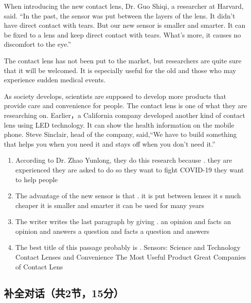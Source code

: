 \documentclass{ExamJHSEngl}
\begin{document}
When introducing the new contact lens, Dr. Guo Shiqi, a researcher at Harvard, said. “In the past, the sensor was put between the layers  of the lens. It didn't have direct contact  with tears. But our new sensor is smaller and smarter. It can be fixed to a lens and keep direct contact with tears. What's more, it causes no discomfort to the eye.”

The contact lens has not been put to the market, but researchers are quite sure that it will be welcomed. It is especially useful for the old and those who may experience sudden medical events.

As society develops, scientists are supposed to develop more products that provide care and convenience  for people. The contact lens is one of what they are researching on. Earlier，a California company developed another kind of contact lens using LED technology. It can show the health information on the mobile phone. Steve Sinclair, head of the company, said,“We have to build something that helps you when you need it and stays off when you don't need it.”

\begin{enumerate}[resume,ref={\arabic*},labelsep=-0.1em]

  \item[\choice{D}] According to Dr. Zhao Yunlong, they do this research because \blank.
  \options
    {they are experienced}
    {they are asked to do so}
    {they want to fight COVID-19}
    {they want to help people }

  \item[\choice{C}] The advantage of the new sensor is that \blank.
  \options
    {it is put between lenses}
    {it s much cheaper}
    {it is smaller and smarter}
    {it can be used for many years }

  \item[\choice{A}] The writer writes the last paragraph by giving \blank.
  \options
    {an opinion and facts}
    {an opinion and answers}
    {a question and facts}
    {a question and answers }

  \item[\choice{B}] The best title of this passage probably is \blank.
  \options
    {Sensors: Science and Technology}
    {Contact Lenses and Convenience}
    {The Most Useful Product}
    {Great Companies of Contact Lens}

\end{enumerate}


\subsection{补全对话（共2节，15分）}
\end{document}
